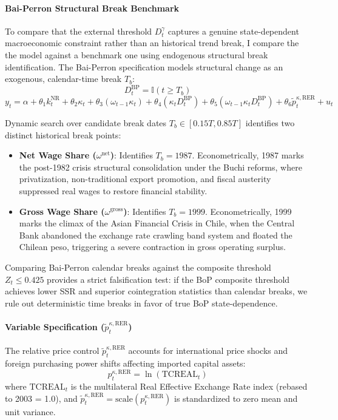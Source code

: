 \paragraph{Bai-Perron Structural Break Benchmark} To compare that the external threshold $D_t^{\gamma}$ captures a genuine state-dependent macroeconomic constraint rather than an historical trend break, I compare the the model against a benchmark one using \citet{BaiPerron2003} endogenous structural break identification. The Bai-Perron specification models structural change as an exogenous, calendar-time break $T_b$:
\begin{equation}
	D_t^{\text{BP}} = \mathbb{I}(t \ge T_b)
\end{equation}
\begin{equation}
	y_t = \alpha + \theta_1 k_t^{\text{NR}} + \theta_2 \kappa_t + \theta_3 (\omega_{t-1} \kappa_t) + \theta_4 (\kappa_t D_t^{\text{BP}}) + \theta_5 (\omega_{t-1} \kappa_t D_t^{\text{BP}}) + \theta_6 \tilde{p}_t^{\kappa, \text{RER}} + u_t
\end{equation}

Dynamic search over candidate break dates $T_b \in [0.15 T, 0.85 T]$ identifies two distinct historical break points:
\begin{itemize}
	\item \textbf{Net Wage Share ($\omega^{\text{net}}$)}: Identifies $T_b = 1987$. Econometrically, 1987 marks the post-1982 crisis structural consolidation under the Buchi reforms, where privatization, non-traditional export promotion, and fiscal austerity suppressed real wages to restore financial stability.
	\item \textbf{Gross Wage Share ($\omega^{\text{gross}}$)}: Identifies $T_b = 1999$. Econometrically, 1999 marks the climax of the Asian Financial Crisis in Chile, when the Central Bank abandoned the exchange rate crawling band system and floated the Chilean peso, triggering a severe contraction in gross operating surplus.
\end{itemize}

Comparing Bai-Perron calendar breaks against the composite threshold $Z_t \le 0.425$ provides a strict falsification test: if the BoP composite threshold achieves lower SSR and superior cointegration statistics than calendar breaks, we rule out deterministic time breaks in favor of true BoP state-dependence.


\paragraph{Variable Specification ($\tilde{p}_t^{\kappa, \text{RER}}$)}
The relative price control $\tilde{p}_t^{\kappa, \text{RER}}$ accounts for international price shocks and foreign purchasing power shifts affecting imported capital assets:
\begin{equation}
	p_t^{\kappa, \text{RER}} = \ln(\text{TCREAL}_t)
\end{equation}
where $\text{TCREAL}_t$ is the multilateral Real Effective Exchange Rate index (rebased to 2003 = 1.0), and $\tilde{p}_t^{\kappa, \text{RER}} = \text{scale}(p_t^{\kappa, \text{RER}})$ is standardized to zero mean and unit variance.

